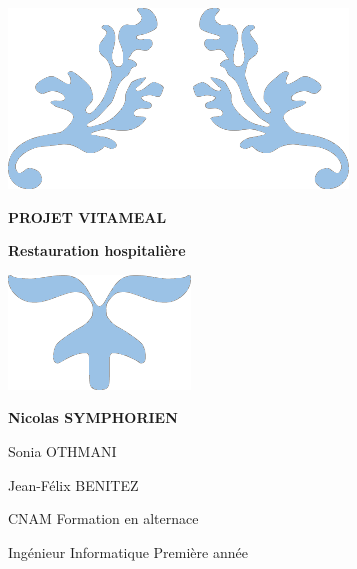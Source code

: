 \begin{titlepage}
\color[RGB]{91, 155, 213}
\parindent=0pt

\begin{center}
\includegraphics[scale=1.0]{images/deco1.png}%
\end{center}

\hrulefill
\begin{center}\bfseries\Huge
    PROJET VITAMEAL
\end{center}
\hrulefill

\begin{center}\bfseries\Large
Restauration hospitalière
\end{center}

\begin{center}
\includegraphics[scale=1.0]{images/deco2.png}%
\end{center}

\vspace*{1cm}
\begin{center}\bfseries\Large
Nicolas SYMPHORIEN

Sonia OTHMANI

Jean-Félix BENITEZ
\end{center}


CNAM  Formation en alternace

Ingénieur Informatique  Première année

\end{titlepage}
